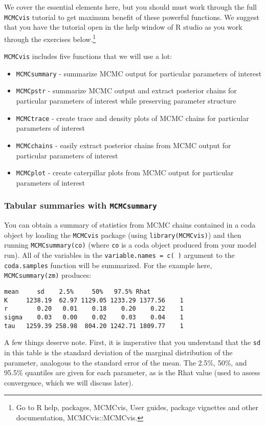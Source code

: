 \documentclass[12pt,english]{article}
\begin{document}
We cover the essential elements here, but you should must work through the  full \texttt{MCMCvis} tutorial  to get maximum benefit of these powerful functions.  We suggest that you have the tutorial open in the help window of R studio as you work through the exercises below.\footnote{Go to R help, packages, MCMCvis, User guides, package vignettes and other documentation, MCMCvis::MCMCvis.}

 \texttt{MCMCvis} includes five functions that we will use a lot:
\begin{itemize}
\item \texttt{MCMCsummary} - summarize MCMC output for particular parameters of interest
\item \texttt{MCMCpstr} - summarize MCMC output and extract posterior chains for particular parameters of interest while preserving parameter structure
\item \texttt{MCMCtrace} - create trace and density plots of MCMC chains for particular parameters of interest
\item \texttt{MCMCchains} - easily extract posterior chains from MCMC output for particular parameters of interest
\item \texttt{MCMCplot} - create caterpillar plots from MCMC output for particular parameters of interest 
\end{itemize}

\subsubsection{Tabular summaries with \texttt{MCMCsummary}}

You can obtain a summary of statistics from MCMC chains contained in a coda object by loading the \texttt{MCMCvis} package (using \texttt{library(MCMCvis)}) and then running \texttt{MCMCsummary(co)} (where \texttt{co} is a coda object produced from your model run). All of the variables in the \texttt{variable.names = c( )} argument to the \texttt{coda.samples} function will be summarized. For the example here, \texttt{MCMCsummary(zm)} produces:

\begin{Verbatim}[fontsize=\small]
         mean     sd    2.5%     50%   97.5% Rhat
K     1238.19  62.97 1129.05 1233.29 1377.56    1
r        0.20   0.01    0.18    0.20    0.22    1
sigma    0.03   0.00    0.02    0.03    0.04    1
tau   1259.39 258.98  804.20 1242.71 1809.77    1
\end{Verbatim}

\noindent A few things deserve note. First, it is imperative that you understand that the \texttt{sd} in this table is the standard deviation of the marginal distribution of the parameter, analogous to the standard error of the mean. The 2.5\%, 50\%, and 95.5\% quantiles are given for each parameter, as is the Rhat value (used to assess convergence, which we will discuss later).
\end{document}
